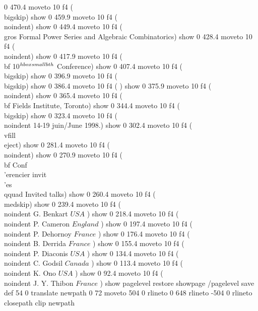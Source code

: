 0 470.4 moveto
10 f4
(\\bigskip) show
0 459.9 moveto
10 f4
(\\noindent) show
0 449.4 moveto
10 f4
({\\gros  Formal Power Series and Algebraic Combinatorics}) show
0 428.4 moveto
10 f4
(\\noindent) show
0 417.9 moveto
10 f4
({\\bf 10$^{\\hbox{\\smallb th}}$ Conference}) show
0 407.4 moveto
10 f4
(\\bigskip) show
0 396.9 moveto
10 f4
(\\bigskip) show
0 386.4 moveto
10 f4
( ) show
0 375.9 moveto
10 f4
(\\noindent) show
0 365.4 moveto
10 f4
({\\bf Fields Institute, Toronto}) show
0 344.4 moveto
10 f4
(\\bigskip) show
0 323.4 moveto
10 f4
(\\noindent 14-19 juin/June 1998.) show
0 302.4 moveto
10 f4
(\\vfill \\eject) show
0 281.4 moveto
10 f4
(\\noindent) show
0 270.9 moveto
10 f4
({\\bf Conf\\'erencier invit\\'es\\qquad  Invited talks}) show
0 260.4 moveto
10 f4
(\\medskip) show
0 239.4 moveto
10 f4
(\\noindent  G. Benkart \(USA\) ) show
0 218.4 moveto
10 f4
(\\noindent  P. Cameron \(England\) ) show
0 197.4 moveto
10 f4
(\\noindent  P. Dehornoy \(France\) ) show
0 176.4 moveto
10 f4
(\\noindent  B. Derrida \(France\) ) show
0 155.4 moveto
10 f4
(\\noindent  P. Diaconis \(USA\) ) show
0 134.4 moveto
10 f4
(\\noindent  C. Godsil \(Canada\) ) show
0 113.4 moveto
10 f4
(\\noindent  K. Ono \(USA\) ) show
0 92.4 moveto
10 f4
(\\noindent  J. Y. Thibon \(France\) ) show
pagelevel restore
showpage
/pagelevel save def
54 0 translate
newpath 0 72 moveto 504 0 rlineto 0 648 rlineto -504 0 rlineto  closepath clip newpath
